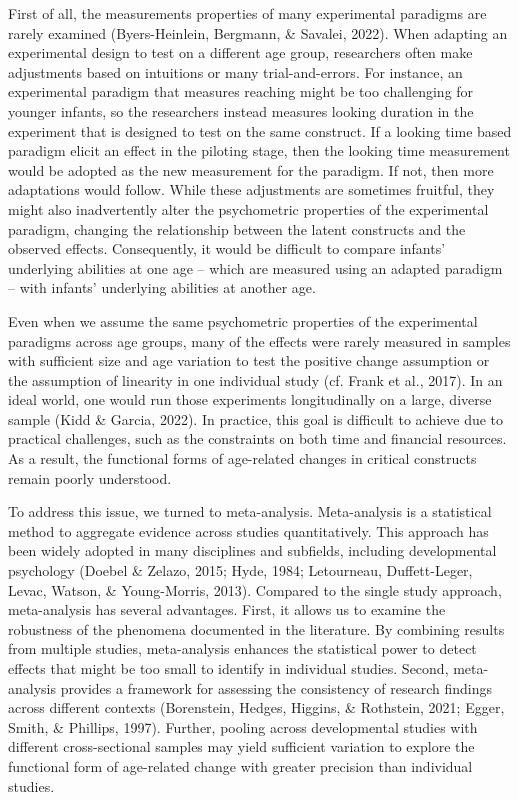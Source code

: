 \documentclass[
  man]{apa6}
\begin{document}
First of all, the measurements properties of many experimental paradigms are rarely examined (Byers-Heinlein, Bergmann, \& Savalei, 2022). When adapting an experimental design to test on a different age group, researchers often make adjustments based on intuitions or many trial-and-errors. For instance, an experimental paradigm that measures reaching might be too challenging for younger infants, so the researchers instead measures looking duration in the experiment that is designed to test on the same construct. If a looking time based paradigm elicit an effect in the piloting stage, then the looking time measurement would be adopted as the new measurement for the paradigm. If not, then more adaptations would follow. While these adjustments are sometimes fruitful, they might also inadvertently alter the psychometric properties of the experimental paradigm, changing the relationship between the latent constructs and the observed effects. Consequently, it would be difficult to compare infants' underlying abilities at one age -- which are measured using an adapted paradigm -- with infants' underlying abilities at another age.

Even when we assume the same psychometric properties of the experimental paradigms across age groups, many of the effects were rarely measured in samples with sufficient size and age variation to test the positive change assumption or the assumption of linearity in one individual study (cf. Frank et al., 2017). In an ideal world, one would run those experiments longitudinally on a large, diverse sample (Kidd \& Garcia, 2022). In practice, this goal is difficult to achieve due to practical challenges, such as the constraints on both time and financial resources. As a result, the functional forms of age-related changes in critical constructs remain poorly understood.

To address this issue, we turned to meta-analysis. Meta-analysis is a statistical method to aggregate evidence across studies quantitatively. This approach has been widely adopted in many disciplines and subfields, including developmental psychology (Doebel \& Zelazo, 2015; Hyde, 1984; Letourneau, Duffett-Leger, Levac, Watson, \& Young-Morris, 2013). Compared to the single study approach, meta-analysis has several advantages. First, it allows us to examine the robustness of the phenomena documented in the literature. By combining results from multiple studies, meta-analysis enhances the statistical power to detect effects that might be too small to identify in individual studies. Second, meta-analysis provides a framework for assessing the consistency of research findings across different contexts (Borenstein, Hedges, Higgins, \& Rothstein, 2021; Egger, Smith, \& Phillips, 1997). Further, pooling across developmental studies with different cross-sectional samples may yield sufficient variation to explore the functional form of age-related change with greater precision than individual studies.
\end{document}
